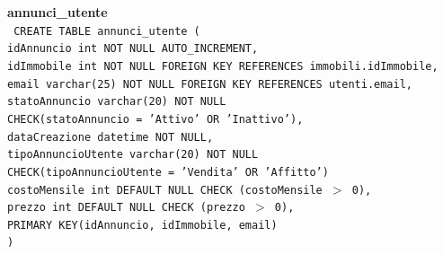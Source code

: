 \documentclass[a4paper,12pt]{report}
\begin{document}
                \noindent
                {\large \textbf{annunci\_utente}} \\
                \texttt{
                    CREATE TABLE annunci\_utente ( \\
                    \null\quad\quad idAnnuncio          int             NOT NULL AUTO\_INCREMENT, \\ 
                    \null\quad\quad idImmobile int NOT NULL FOREIGN KEY REFERENCES immobili.idImmobile, \\
                    \null\quad\quad email varchar(25) NOT NULL FOREIGN KEY REFERENCES utenti.email, \\
                    \null\quad\quad statoAnnuncio       varchar(20)         NOT NULL \\
                            \null\qquad\qquad CHECK(statoAnnuncio = 'Attivo' OR 'Inattivo'), \\
                    \null\quad\quad dataCreazione       datetime        NOT NULL, \\
                    \null\quad\quad tipoAnnuncioUtente  varchar(20)  NOT NULL \\
                            \null\qquad\qquad CHECK(tipoAnnuncioUtente = 'Vendita' OR 'Affitto') \\
                    \null\quad\quad costoMensile        int             DEFAULT NULL CHECK (costoMensile $>$ 0), \\
                    \null\quad\quad prezzo              int             DEFAULT NULL CHECK (prezzo $>$ 0),\\
                    \null\quad\quad PRIMARY KEY(idAnnuncio, idImmobile, email) \\
                    )
                    } \\
\end{document}
